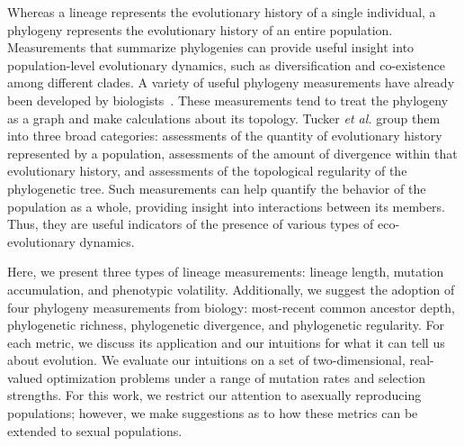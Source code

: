 \documentclass[letterpaper]{article}
\begin{document}
Whereas a lineage represents the evolutionary history of a single individual, a phylogeny represents the evolutionary history of an entire population. Measurements that summarize phylogenies can provide useful insight into population-level evolutionary dynamics, such as diversification and co-existence among different clades. A variety of useful phylogeny measurements have already been developed by biologists~\citep{tucker_guide_2017}. These measurements tend to treat the phylogeny as a graph and make calculations about its topology. Tucker \textit{et al.} group them into three broad categories: assessments of the quantity of evolutionary history represented by a population, assessments of the amount of divergence within that evolutionary history, and assessments of the topological regularity of the phylogenetic tree. Such measurements can help quantify the behavior of the population as a whole, providing insight into interactions between its members. Thus, they are useful indicators of the presence of various types of eco-evolutionary dynamics.

Here, we present three types of lineage measurements: lineage length, mutation accumulation, and phenotypic volatility. Additionally, we suggest the adoption of four phylogeny measurements from biology: most-recent common ancestor depth, phylogenetic richness, phylogenetic divergence, and phylogenetic regularity. For each metric, we discuss its application and our intuitions for what it can tell us about evolution. We evaluate our intuitions on a set of two-dimensional, real-valued optimization problems under a range of mutation rates and selection strengths. For this work, we restrict our attention to asexually reproducing populations; however, we make suggestions as to how these metrics can be extended to sexual populations. 
\end{document}
